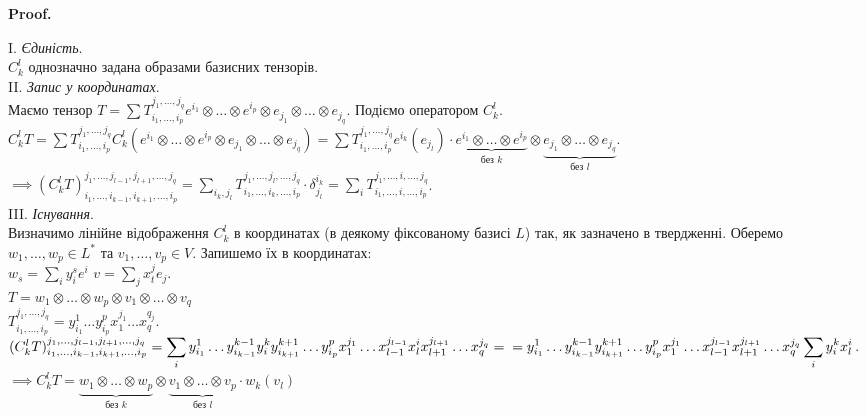 \documentclass[a4paper, 10pt]{article}
\makeatletter
\theoremstyle{theoremdd}
\renewenvironment{proof}[1][Proof.\\]{\par
\pushQED{\hfill \qed}%
\normalfont \topsep6\p@\@plus6\p@\relax
\trivlist
\item\relax
{\bfseries
#1\@addpunct{.}}\hspace\labelsep\ignorespaces
}{%
\popQED\endtrivlist\@endpefalse
}
\makeatother
\begin{document}
\begin{proof}
I. \textit{Єдиність}.\\
$C_k^l$ однозначно задана образами базисних тензорів.
\bigskip \\
II. \textit{Запис у координатах}.\\
Маємо тензор $T = \displaystyle\sum T_{i_1,\dots,i_p}^{j_1,\dots,j_q} e^{i_1} \otimes \dots \otimes e^{i_p} \otimes e_{j_1} \otimes \dots \otimes e_{j_q}$. Подіємо оператором $C_k^l$.\\
$C_k^l T = \displaystyle\sum T_{i_1,\dots,i_p}^{j_1,\dots,j_q} C_k^l(e^{i_1} \otimes \dots \otimes e^{i_p} \otimes e_{j_1} \otimes \dots \otimes e_{j_q}) = \sum T_{i_1,\dots,i_p}^{j_1,\dots,j_q} e^{i_k}(e_{j_l}) \cdot \underbrace{e^{i_1} \otimes \dots \otimes e^{i_p}}_{\text{без }k} \otimes \underbrace{e_{j_1} \otimes \dots \otimes e_{j_q}}_{\text{без }l}$.\\
$\implies (C_k^l T)_{i_1,\dots,i_{k-1},i_{k+1},\dots,i_p}^{j_1,\dots,j_{l-1},j_{l+1},\dots,j_q} = \displaystyle\sum_{i_k,j_l} T_{i_1,\dots,i_k,\dots,i_p}^{j_1,\dots,j_l,\dots,j_q} \cdot \delta_{j_l}^{i_k} = \sum_{i} T_{i_1,\dots,i,\dots,i_p}^{j_1,\dots,i,\dots,j_q}$.
\bigskip \\
III. \textit{Існування}.\\
Визначимо лінійне відображення $C_k^l$ в координатах (в деякому фіксованому базисі $L$) так, як зазначено в твердженні. Оберемо $w_1,\dots,w_p \in L^*$ та $v_1,\dots,v_p \in V$. Запишемо їх в координатах:\\
$w_s = \displaystyle\sum_i y_i^s e^i$ \qquad $v = \displaystyle\sum_j x^j_t e_j$.\\
$T = w_1 \otimes \dots \otimes w_p \otimes v_1 \otimes \dots \otimes v_q$\\
$T_{i_1,\dots,i_p}^{j_1,\dots,j_q} = y_{i_1}^1 \dots y_{i_p}^p x_1^{j_1} \dots x_q^{q_j}$.\\
$(C_k^l T)_{i_1,\dots,i_{k-1},i_{k+1},\dots,i_p}^{j_1,\dots,j_{l-1},j_{l+1},\dots,j_q} = \displaystyle\sum_i y_{i_1}^1 \dots y_{i_{k-1}}^{k-1} y_i^k y_{i_{k+1}}^{k+1} \dots y_{i_p}^p x_1^{j_1} \dots x_{l-1}^{j_{l-1}} x_l^i x_{l+1}^{j_{l+1}} \dots x_q^{j_q} = \\
= y_{i_1}^1 \dots y_{i_{k-1}}^{k-1} y_{i_{k+1}}^{k+1} \dots y_{i_p}^p x_1^{j_1} \dots x_{l-1}^{j_{l-1}} x_{l+1}^{j_{l+1}} \dots x_q^{j_q} \sum_i y_i^k x_l^i$.\\
$\implies C_k^l T = \underbrace{w_1 \otimes \dots \otimes w_p}_{\text{без }k} \otimes \underbrace{v_1 \otimes \dots \otimes v_p}_{\text{без }l} \cdot w_k(v_l)$
\end{proof}
\end{document}
